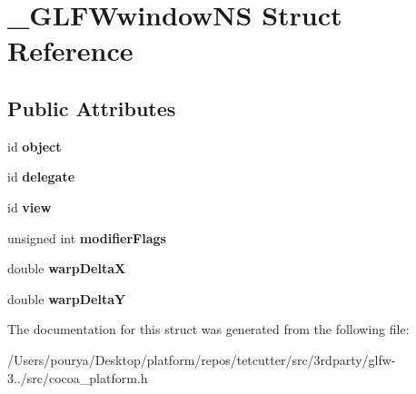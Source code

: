 \hypertarget{struct__GLFWwindowNS}{}\section{\+\_\+\+G\+L\+F\+Wwindow\+N\+S Struct Reference}
\label{struct__GLFWwindowNS}
\subsection*{Public Attributes}
\begin{DoxyCompactItemize}
\item 
\hypertarget{struct__GLFWwindowNS_a2a4f012e935383d09b043e4376099160}{}id {\bfseries object}\label{struct__GLFWwindowNS_a2a4f012e935383d09b043e4376099160}

\item 
\hypertarget{struct__GLFWwindowNS_a97ed2f5df9e3df607bb3ce0dc0512e66}{}id {\bfseries delegate}\label{struct__GLFWwindowNS_a97ed2f5df9e3df607bb3ce0dc0512e66}

\item 
\hypertarget{struct__GLFWwindowNS_a58bca42aa517b4df7049ae5f7e179ce5}{}id {\bfseries view}\label{struct__GLFWwindowNS_a58bca42aa517b4df7049ae5f7e179ce5}

\item 
\hypertarget{struct__GLFWwindowNS_a3f9ed4c22a6b38b938b7763b3c6870a9}{}unsigned int {\bfseries modifier\+Flags}\label{struct__GLFWwindowNS_a3f9ed4c22a6b38b938b7763b3c6870a9}

\item 
\hypertarget{struct__GLFWwindowNS_a103de52c87f3519926e6bdf5d9421cb9}{}double {\bfseries warp\+Delta\+X}\label{struct__GLFWwindowNS_a103de52c87f3519926e6bdf5d9421cb9}

\item 
\hypertarget{struct__GLFWwindowNS_a1395dfe09823f65123c44c0d468028e3}{}double {\bfseries warp\+Delta\+Y}\label{struct__GLFWwindowNS_a1395dfe09823f65123c44c0d468028e3}

\end{DoxyCompactItemize}


The documentation for this struct was generated from the following file\+:\begin{DoxyCompactItemize}
\item 
/\+Users/pourya/\+Desktop/platform/repos/tetcutter/src/3rdparty/glfw-\/3../src/cocoa\+\_\+platform.\+h\end{DoxyCompactItemize}
